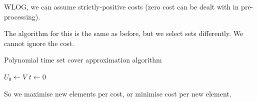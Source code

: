 WLOG, we can assume strictly-positive costs (zero cost can be dealt with in pre-processing).

\begin{theorem}
    The algorithm for this is the same as before, but we select sets differently. We cannot ignore the cost.

    \begin{algorithm}[H]
        \caption{Polynomial time set cover approximation algorithm}
        \DontPrintSemicolon
        $U_0 \leftarrow V$ 
        $t \leftarrow 0$ 
    \end{algorithm}

    So we maximise new elements per cost, or minimise cost per new element.
\end{theorem}

